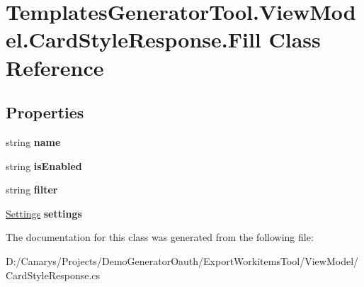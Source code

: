 \hypertarget{class_templates_generator_tool_1_1_view_model_1_1_card_style_response_1_1_fill}{}\section{Templates\+Generator\+Tool.\+View\+Model.\+Card\+Style\+Response.\+Fill Class Reference}
\label{class_templates_generator_tool_1_1_view_model_1_1_card_style_response_1_1_fill}
\subsection*{Properties}
\begin{DoxyCompactItemize}
\item 
\mbox{\label{class_templates_generator_tool_1_1_view_model_1_1_card_style_response_1_1_fill_a3d35810e1a43e6e56300be2428520b1c}} 
string {\bfseries name}
\item 
\mbox{\label{class_templates_generator_tool_1_1_view_model_1_1_card_style_response_1_1_fill_a719c6156040f35b44749e281a2156928}} 
string {\bfseries is\+Enabled}
\item 
\mbox{\label{class_templates_generator_tool_1_1_view_model_1_1_card_style_response_1_1_fill_a770a37ecac5b1129beebef242bd17665}} 
string {\bfseries filter}
\item 
\mbox{\label{class_templates_generator_tool_1_1_view_model_1_1_card_style_response_1_1_fill_a596224d4b8f7f337db38d4809af0da7d}} 
\mbox{\hyperlink{class_templates_generator_tool_1_1_view_model_1_1_card_style_response_1_1_settings}{Settings}} {\bfseries settings}
\end{DoxyCompactItemize}


The documentation for this class was generated from the following file\+:\begin{DoxyCompactItemize}
\item 
D\+:/\+Canarys/\+Projects/\+Demo\+Generator\+Oauth/\+Export\+Workitems\+Tool/\+View\+Model/Card\+Style\+Response.\+cs\end{DoxyCompactItemize}

